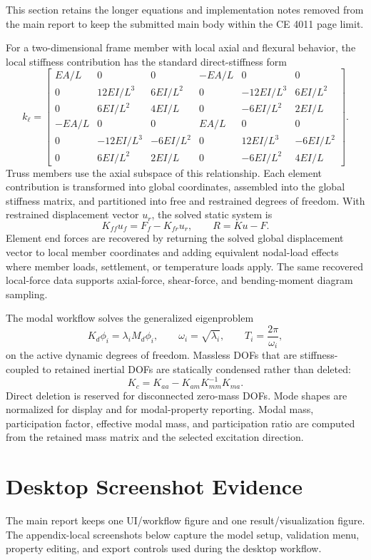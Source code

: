 \documentclass[11pt,a4paper]{article}
\begin{document}
This section retains the longer equations and implementation notes removed from the main report to keep the submitted main body within the CE 4011 page limit.

For a two-dimensional frame member with local axial and flexural behavior, the local stiffness contribution has the standard direct-stiffness form
\[
k_\ell =
\begin{bmatrix}
EA/L & 0 & 0 & -EA/L & 0 & 0\\
0 & 12EI/L^3 & 6EI/L^2 & 0 & -12EI/L^3 & 6EI/L^2\\
0 & 6EI/L^2 & 4EI/L & 0 & -6EI/L^2 & 2EI/L\\
-EA/L & 0 & 0 & EA/L & 0 & 0\\
0 & -12EI/L^3 & -6EI/L^2 & 0 & 12EI/L^3 & -6EI/L^2\\
0 & 6EI/L^2 & 2EI/L & 0 & -6EI/L^2 & 4EI/L
\end{bmatrix}.
\]
Truss members use the axial subspace of this relationship. Each element contribution is transformed into global coordinates, assembled into the global stiffness matrix, and partitioned into free and restrained degrees of freedom. With restrained displacement vector \(u_r\), the solved static system is
\[
K_{ff}u_f=F_f-K_{fr}u_r,\qquad R=Ku-F.
\]
Element end forces are recovered by returning the solved global displacement vector to local member coordinates and adding equivalent nodal-load effects where member loads, settlement, or temperature loads apply. The same recovered local-force data supports axial-force, shear-force, and bending-moment diagram sampling.

The modal workflow solves the generalized eigenproblem
\[
K_d\phi_i=\lambda_i M_d\phi_i,\qquad \omega_i=\sqrt{\lambda_i},\qquad T_i=\frac{2\pi}{\omega_i},
\]
on the active dynamic degrees of freedom. Massless DOFs that are stiffness-coupled to retained inertial DOFs are statically condensed rather than deleted:
\[
K_c=K_{aa}-K_{am}K_{mm}^{-1}K_{ma}.
\]
Direct deletion is reserved for disconnected zero-mass DOFs. Mode shapes are normalized for display and for modal-property reporting. Modal mass, participation factor, effective modal mass, and participation ratio are computed from the retained mass matrix and the selected excitation direction.

\section{Desktop Screenshot Evidence}

The main report keeps one UI/workflow figure and one result/visualization figure. The appendix-local screenshots below capture the model setup, validation menu, property editing, and export controls used during the desktop workflow.
\end{document}
